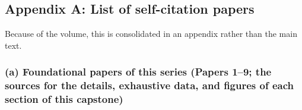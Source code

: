 \documentclass[
  a4paper,
]{ltjsarticle}
\begin{document}
\subsection{Appendix A: List of self-citation
papers}\label{appendix-a-list-of-self-citation-papers}

Because of the volume, this is consolidated in an appendix rather than
the main text.

\subsubsection{(a) Foundational papers of this series (Papers 1--9; the
sources for the details, exhaustive data, and figures of each section of
this
capstone)}\label{a-foundational-papers-of-this-series-papers-19-the-sources-for-the-details-exhaustive-data-and-figures-of-each-section-of-this-capstone}
\end{document}
